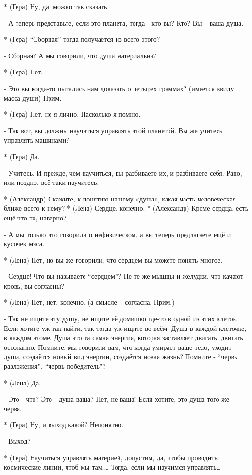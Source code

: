 * (Гера) Ну, да, можно так сказать.

- А теперь представьте, если это планета, тогда - кто вы? Кто? Вы – ваша душа.

* (Гера)  “Сборная” тогда получается из всего этого?

- Сборная? А мы говорили, что душа материальна?

* (Гера) Нет.

- Это вы когда-то пытались нам доказать о четырех граммах? (имеется ввиду масса души) Прим.

* (Гера) Нет, не я лично. Насколько я помню.

- Так вот, вы должны научиться управлять этой планетой. Вы же учитесь управлять машинами? 

* (Гера) Да.

- Учитесь. И прежде, чем научиться, вы разбиваете их, и разбиваете себя. Рано, или поздно, всё-таки научитесь.

* (Александр) Скажите, к понятию нашему «душа», какая часть человеческая ближе всего к нему?
* (Лена) Сердце, конечно.
* (Александр) Кроме сердца, есть ещё что-то, наверно?

- А мы только что говорили о нефизическом, а вы теперь предлагаете ещё и кусочек мяса. 

* (Лена) Нет, но вы же говорили, что сердцем вы можете понять многое.

- Сердце! Что вы называете “сердцем”? Не те же мышцы и желудки, что качают кровь, вы согласны?

* (Лена) Нет, нет, конечно. (а смысле – согласна. Прим.)

- Так не ищите эту душу, не ищите её домишко где-то в одной из этих клеток. Если хотите уж так найти, так тогда уж ищите во всём. Душа в каждой клеточке, в каждом атоме. Душа это та самая энергия, которая заставляет двигать, двигать осознанно. Помните, мы говорили вам, что когда умирает ваше тело, уходит душа, создаётся новый вид энергии, создаётся новая жизнь? Помните - “червь разложения”, “червь победитель”? 

* (Лена) Да.

- Это - что? Это - душа ваша? Нет, не ваша! Если хотите, это душа того же червя.

* (Гера) Ну, и выход какой? Непонятно.

- Выход?

* (Гера) Научиться управлять материей, допустим, да, чтобы проводить космические линии, чтоб мы там.… Тогда, если мы научимся управлять…

